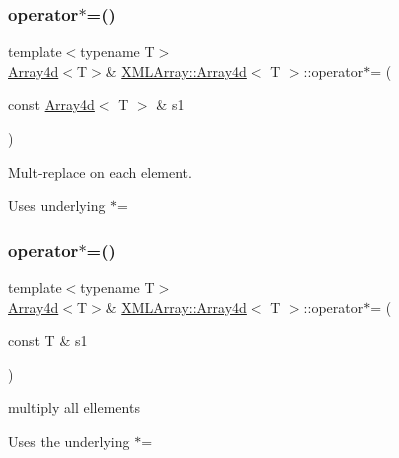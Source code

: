 \subsubsection{\texorpdfstring{operator$\ast$=()}{operator*=()}\hspace{0.1cm}{\footnotesize\ttfamily [2/4]}}
{\footnotesize\ttfamily template$<$typename T$>$ \\
\mbox{\hyperlink{classXMLArray_1_1Array4d}{Array4d}}$<$T$>$\& \mbox{\hyperlink{classXMLArray_1_1Array4d}{X\+M\+L\+Array\+::\+Array4d}}$<$ T $>$\+::operator$\ast$= (\begin{DoxyParamCaption}\item[{const \mbox{\hyperlink{classXMLArray_1_1Array4d}{Array4d}}$<$ T $>$ \&}]{s1 }\end{DoxyParamCaption})\hspace{0.3cm}{\ttfamily [inline]}}



Mult-\/replace on each element. 

Uses underlying $\ast$= \mbox{\label{classXMLArray_1_1Array4d_ac8c9fbcc39636658f94e7adc00c172b3}} 
\subsubsection{\texorpdfstring{operator$\ast$=()}{operator*=()}\hspace{0.1cm}{\footnotesize\ttfamily [3/4]}}
{\footnotesize\ttfamily template$<$typename T$>$ \\
\mbox{\hyperlink{classXMLArray_1_1Array4d}{Array4d}}$<$T$>$\& \mbox{\hyperlink{classXMLArray_1_1Array4d}{X\+M\+L\+Array\+::\+Array4d}}$<$ T $>$\+::operator$\ast$= (\begin{DoxyParamCaption}\item[{const T \&}]{s1 }\end{DoxyParamCaption})\hspace{0.3cm}{\ttfamily [inline]}}



multiply all ellements 

Uses the underlying $\ast$= \mbox{\label{classXMLArray_1_1Array4d_ac8c9fbcc39636658f94e7adc00c172b3}} 
